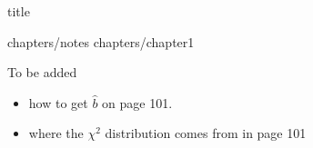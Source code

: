 \documentclass[12pt]{book}
\begin{document}
\frontmatter



{title}

\tableofcontents

\restoregeometry

\mainmatter


\setcounter{chapter}{-1} %
{chapters/notes}
{chapters/chapter1}

\newpage

To be added
\begin{itemize}
    \item how to get $\hat b$ on page 101.
    \item where the $\chi^2$ distribution comes from in page 101
\end{itemize}
	

\backmatter
\end{document}
